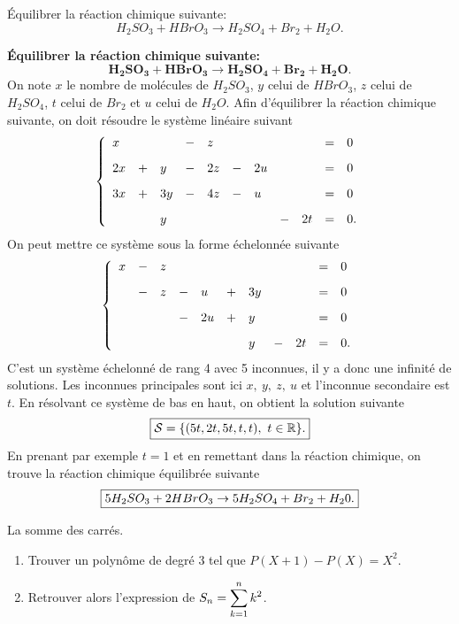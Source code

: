 \documentclass[a4paper, 11pt,reqno]{article}
\begin{document}
\begin{exercice}  \;
\'Equilibrer la r\'eaction chimique suivante:
$$H_2SO_3 + HBrO_3\rightarrow H_2SO_4 +Br_2 +H_2O         .$$
\end{exercice}
\begin{correction}   \;
\textbf{\'Equilibrer la r\'eaction chimique suivante:}
$$\mathbf{H_2SO_3 + HBrO_3\rightarrow H_2SO_4 +Br_2 +H_2O.}$$
On note $x$ le nombre de mol\'ecules de $H_2SO_3$, $y$ celui de $HBrO_3$, $z$ celui de $H_2SO_4$, $t$ celui de $Br_2$ et $u$ celui de $H_2O$. Afin d'\'equilibrer la r\'eaction chimique suivante, on doit r\'esoudre le syst\`eme lin\'eaire suivant
$$\left\lbrace\begin{array}{lllllllllll}
x & & &- & z &&&&&=&0\vsec\\
2x& +& y&-&2z&-&2u &&&=&0\vsec\\
3x&+ &3y & -& 4z& -& u &&&=&0\vsec\\
&&y&&&&&-&2t&=&0.
\end{array}\right.$$
On peut mettre ce syst\`eme sous la forme \'echelonn\'ee suivante
$$\left\lbrace\begin{array}{lllllllllll}
x &- & z& &  &&&&&=&0\vsec\\
& -& z&-&u&+&3y &&&=&0\vsec\\
& & & -& 2u& +& y &&&=&0\vsec\\
&&&&&&y&-&2t&=&0.
\end{array}\right.$$
C'est un syst\`eme \'echelonn\'e de rang 4 avec 5 inconnues, il y a donc une infinit\'e de solutions. Les inconnues principales sont ici $x,\ y,\ z,\ u$ et l'inconnue secondaire est $t$. En r\'esolvant ce syst\`eme de bas en haut, on obtient la solution suivante
$$\fbox{$\mathcal{S}=\lbrace (5t,2t,5t,t,t),\ t\in\R \rbrace.$}$$
En prenant par exemple $t=1$ et en remettant dans la r\'eaction chimique, on trouve la r\'eaction  chimique \'equilibr\'ee suivante
$$\fbox{$5H_2SO_3 +2HBrO_3\rightarrow 5H_2SO_4+Br_2+H_20.$}$$
\end{correction}
\begin{exercice}   \;
La somme des carr\'es.
\begin{enumerate}
 \item 
Trouver un polyn\^ome de degr\'e 3 tel que 
$P(X+1)-P(X)=X^2.$
\item 
Retrouver alors l'expression de $S_n=\displaystyle \sum\limits_{k=1}^n k^2$.
\end{enumerate}
\end{exercice}
\end{document}
